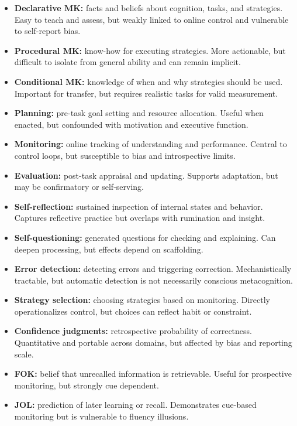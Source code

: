 \documentclass[a4paper]{article}
\begin{document}
   \begin{itemize}
      \item \textbf{Declarative MK:} facts and beliefs about cognition, tasks, and strategies. Easy to teach and assess, but weakly linked to online control and vulnerable to self-report bias.
      \item \textbf{Procedural MK:} know-how for executing strategies. More actionable, but difficult to isolate from general ability and can remain implicit.
      \item \textbf{Conditional MK:} knowledge of when and why strategies should be used. Important for transfer, but requires realistic tasks for valid measurement.
      \item \textbf{Planning:} pre-task goal setting and resource allocation. Useful when enacted, but confounded with motivation and executive function.
      \item \textbf{Monitoring:} online tracking of understanding and performance. Central to control loops, but susceptible to bias and introspective limits.
      \item \textbf{Evaluation:} post-task appraisal and updating. Supports adaptation, but may be confirmatory or self-serving.
      \item \textbf{Self-reflection:} sustained inspection of internal states and behavior. Captures reflective practice but overlaps with rumination and insight.
      \item \textbf{Self-questioning:} generated questions for checking and explaining. Can deepen processing, but effects depend on scaffolding.
      \item \textbf{Error detection:} detecting errors and triggering correction. Mechanistically tractable, but automatic detection is not necessarily conscious metacognition.
      \item \textbf{Strategy selection:} choosing strategies based on monitoring. Directly operationalizes control, but choices can reflect habit or constraint.
      \item \textbf{Confidence judgments:} retrospective probability of correctness. Quantitative and portable across domains, but affected by bias and reporting scale.
      \item \textbf{FOK:} belief that unrecalled information is retrievable. Useful for prospective monitoring, but strongly cue dependent.
      \item \textbf{JOL:} prediction of later learning or recall. Demonstrates cue-based monitoring but is vulnerable to fluency illusions.

\end{itemize}
\end{document}
